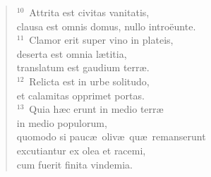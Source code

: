 \begin{flushleft}
\begin{verse}
${}^{10}$~Attrita est civitas vanitatis,\\ clausa est omnis domus, nullo intro\"eunte.\\
${}^{11}$~Clamor erit super vino in plateis,\\ deserta est omnia l\ae titia,\\ translatum est gaudium terr\ae .\\
${}^{12}$~Relicta est in urbe solitudo,\\ et calamitas opprimet portas.\\
${}^{13}$~Quia h\ae c erunt in medio terr\ae \\ in medio populorum,\\ quomodo si pauc\ae\ oliv\ae\ qu\ae\ remanserunt\\ excutiantur ex olea et racemi,\\ cum fuerit finita vindemia.\end{verse}\end{flushleft}


